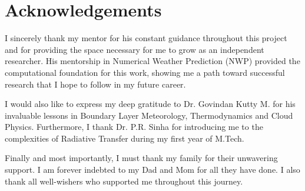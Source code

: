 
\cleardoublepage

\chapter*{Acknowledgements}


I sincerely thank my mentor \Supervisor for his constant
  guidance throughout this project and for providing the space
  necessary for me to grow as an independent researcher. His
  mentorship in Numerical Weather Prediction (NWP) provided the
  computational foundation for this work, showing me a path toward
  successful research that I hope to follow in my future career.

  I would also like to express my deep gratitude to Dr. Govindan
  Kutty M. for his invaluable lessons in Boundary Layer Meteorology,
  Thermodynamics and Cloud Physics. Furthermore, I thank Dr. P.R.
  Sinha for introducing me to the complexities of Radiative Transfer
  during my first year of M.Tech.

  Finally and most importantly, I must thank my family for their
  unwavering support. I am forever indebted to my Dad and Mom for all
  they have done. I also thank all well-wishers who supported me
  throughout this journey.

  \vspace{1.2cm}
  \begin{center}
    \textcolor{gray!30}{}
  \end{center}


\vfill
